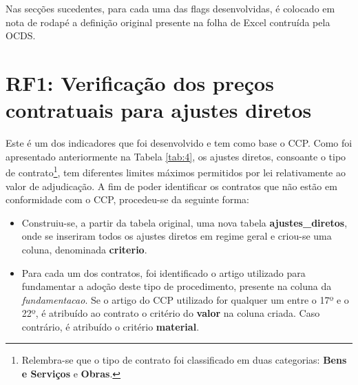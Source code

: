 Nas secções sucedentes, para cada uma das flags desenvolvidas, é colocado em nota de rodapé a definição original presente na folha de Excel contruída pela OCDS.



\section{RF1: Verificação dos preços contratuais para ajustes diretos}


Este é um dos indicadores que foi desenvolvido e tem como base o CCP. Como foi apresentado anteriormente na Tabela \ref{tab:4}, os ajustes diretos, consoante o tipo de contrato\footnote{Relembra-se que o tipo de contrato foi classificado em duas categorias: \textbf{Bens e Serviços} e \textbf{Obras}.}, tem diferentes limites máximos permitidos por lei relativamente ao valor de adjudicação. A fim de poder identificar os contratos que não estão em conformidade com o CCP, procedeu-se da seguinte forma:

\begin{itemize}
	
	\item Construiu-se, a partir da tabela original, uma nova tabela \textbf{ajustes\_diretos}, onde se inseriram todos os ajustes diretos em regime geral e criou-se uma coluna, denominada \textbf{criterio}. 

	\item Para cada um dos contratos, foi identificado o artigo utilizado para fundamentar a adoção deste tipo de procedimento, presente na coluna da \textit{fundamentacao}. Se o artigo do CCP utilizado for qualquer um entre o 17º e o 22º, é atribuído ao contrato o critério do \textbf{valor} na coluna criada. Caso contrário, é atribuído o critério \textbf{material}.
	
\end{itemize}


